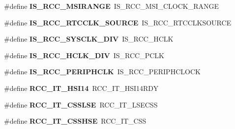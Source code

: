 \begin{DoxyCompactItemize}
\#define {\bfseries I\+S\+\_\+\+R\+C\+C\+\_\+\+M\+S\+I\+R\+A\+N\+GE}~I\+S\+\_\+\+R\+C\+C\+\_\+\+M\+S\+I\+\_\+\+C\+L\+O\+C\+K\+\_\+\+R\+A\+N\+GE
\item 
\mbox{\label{group___h_a_l___r_c_c___aliased_gafbf1d14cdfb90a3da2148a8b398fae50}} 
\#define {\bfseries I\+S\+\_\+\+R\+C\+C\+\_\+\+R\+T\+C\+C\+L\+K\+\_\+\+S\+O\+U\+R\+CE}~I\+S\+\_\+\+R\+C\+C\+\_\+\+R\+T\+C\+C\+L\+K\+S\+O\+U\+R\+CE
\item 
\mbox{\label{group___h_a_l___r_c_c___aliased_ga43366c08676a120c9c7ec17169183054}} 
\#define {\bfseries I\+S\+\_\+\+R\+C\+C\+\_\+\+S\+Y\+S\+C\+L\+K\+\_\+\+D\+IV}~I\+S\+\_\+\+R\+C\+C\+\_\+\+H\+C\+LK
\item 
\mbox{\label{group___h_a_l___r_c_c___aliased_ga10acdfe634bde9d8591127e09c290178}} 
\#define {\bfseries I\+S\+\_\+\+R\+C\+C\+\_\+\+H\+C\+L\+K\+\_\+\+D\+IV}~I\+S\+\_\+\+R\+C\+C\+\_\+\+P\+C\+LK
\item 
\mbox{\label{group___h_a_l___r_c_c___aliased_gad38e6304f89528092a9a24943b955d03}} 
\#define {\bfseries I\+S\+\_\+\+R\+C\+C\+\_\+\+P\+E\+R\+I\+P\+H\+C\+LK}~I\+S\+\_\+\+R\+C\+C\+\_\+\+P\+E\+R\+I\+P\+H\+C\+L\+O\+CK
\item 
\mbox{\label{group___h_a_l___r_c_c___aliased_ga1d2b2eb3fca0475683b879377c952fbf}} 
\#define {\bfseries R\+C\+C\+\_\+\+I\+T\+\_\+\+H\+S\+I14}~R\+C\+C\+\_\+\+I\+T\+\_\+\+H\+S\+I14\+R\+DY
\item 
\mbox{\label{group___h_a_l___r_c_c___aliased_ga2693825b3d6ae5e2202c59e9ff0f84e9}} 
\#define {\bfseries R\+C\+C\+\_\+\+I\+T\+\_\+\+C\+S\+S\+L\+SE}~R\+C\+C\+\_\+\+I\+T\+\_\+\+L\+S\+E\+C\+SS
\item 
\mbox{\label{group___h_a_l___r_c_c___aliased_ga0f173b0e032747b82a9322739f6e3635}} 
\#define {\bfseries R\+C\+C\+\_\+\+I\+T\+\_\+\+C\+S\+S\+H\+SE}~R\+C\+C\+\_\+\+I\+T\+\_\+\+C\+SS
\item 
\mbox{\label{group___h_a_l___r_c_c___aliased_ga7ff52ba9f89830affd1e02929b4db74e}} 

\end{DoxyCompactItemize}
